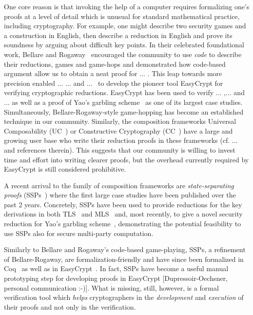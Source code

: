 {One core reason is that invoking the help of a computer requires formalizing one's proofs at a level of detail which is unusual for standard mathematical practice, including cryptography. For example, one might describe two security games and a construction in English, then describe a reduction in English and prove its soundness by arguing about difficult key points. In their celebrated foundational work, Bellare and Rogaway~\cite{X} encouraged the community to use \emph{code} to describe their reductions, games and game-hops and demonstrated how code-based argument allow us to obtain a neat proof for ... . This leap towards more precision enabled ... ... and ...~\cite{X} to develop the pioneer tool EasyCrypt for verifying cryptographic reductions. EasyCrypt has been used to verify ... ,... and ... as well as a proof of Yao's garbling scheme~\cite{X} as one of its largest case studies. Simultaneously, Bellare-Rogaway-style game-hopping has become an established technique in our community. Similarly, the composition frameworks Universal Composability (UC~\cite{X}) or Constructive Cryptography (CC~\cite{X}) have a large and growing user base who write their reduction proofs in these frameworks (cf. ... and references therein). This suggests that our community is willing to invest time and effort into writing clearer proofs, but the overhead currently required by EasyCrypt is still considered prohibitive. 

A recent arrival to the family of composition frameworks are \emph{state-separating proofs} (SSPs~\cite{X}) where the first large case studies have been published over the past 2 years. Concretely, SSPs have been used to provide reductions for the key derivations in both TLS~\cite{X} and MLS~\cite{X} and, most recently, to give a novel security reduction for Yao's garbling scheme~\cite{X}, demonstrating the potential feasibility to use SSPs also for secure multi-party computation.

Similarly to Bellare and Rogaway's code-based game-playing, SSPs, a refinement of Bellare-Rogaway, are formalization-friendly and have since been formalized in Coq~\cite{X} as well as in EasyCrypt~\cite{X}. In fact, SSPs have become a useful manual prototyping step for developing proofs in EasyCrypt [Dupressoir-Oechsner, personal communication :-)]. What is missing, still, however, is a formal verification tool which \emph{helps} cryptographers in the \emph{development} and \emph{execution} of their proofs and not only in the verification.

}

